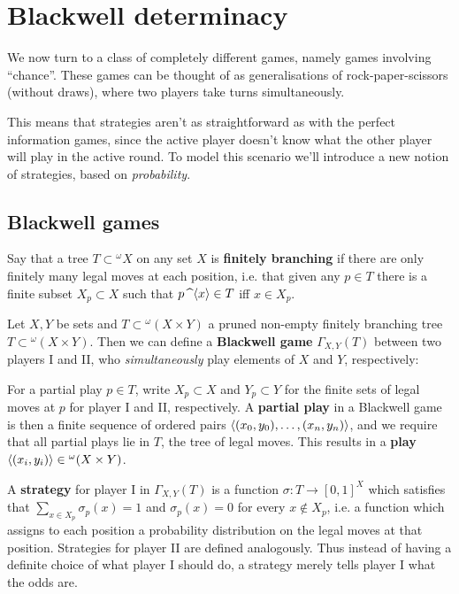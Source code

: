 \chapter{Blackwell determinacy}
\thispagestyle{fancy}
\label{ch3}

We now turn to a class of completely different games, namely games involving ``chance''. These games can be thought of as generalisations of rock-paper-scissors (without draws), where two players take turns simultaneously.

\qquad This means that strategies aren't as straightforward as with the perfect information games, since the active player doesn't know what the other player will play in the active round. To model this scenario we'll introduce a new notion of strategies, based on \textit{probability}.

\section{Blackwell games}

Say that a tree $T\subset{^\omega X}$ on any set $X$ is \textbf{finitely branching} if there are only finitely many legal moves at each position, i.e. that given any $p\in T$ there is a finite subset $X_p\subset X$ such that $p\operatorname{\text{\textasciicircum}}\langle x\rangle\in T$ iff $x\in X_p$.

\qquad Let $X,Y$ be sets and $T\subset{^\omega(X\times Y)}$ a pruned non-empty finitely branching tree $T\subset{^\omega(X\times Y)}$. Then we can define a \textbf{Blackwell game} $\Gamma_{X,Y}(T)$ between two players I and II, who \textit{simultaneously} play elements of $X$ and $Y$, respectively:

\qquad For a partial play $p\in T$, write $X_p\subset X$ and $Y_p\subset Y$ for the finite sets of legal moves at $p$ for player I and II, respectively. A \textbf{partial play} in a Blackwell game is then a finite sequence of ordered pairs $\langle (x_0,y_0),\hdots,(x_n,y_n)\rangle$, and we require that all partial plays lie in $T$, the tree of legal moves. This results in a \textbf{play} $\langle (x_i,y_i)\rangle\in{^\omega(X\times Y)}$.

\qquad A \textbf{strategy} for player I in $\Gamma_{X,Y}(T)$ is a function $\sigma:T\to [0,1]^X$ which satisfies that $\sum_{x\in X_p}\sigma_p(x)=1$ and $\sigma_p(x)=0$ for every $x\notin X_p$, i.e. a function which assigns to each position a probability distribution on the legal moves at that position. Strategies for player II are defined analogously. Thus instead of having a definite choice of what player I should do, a strategy merely tells player I what the odds are.

